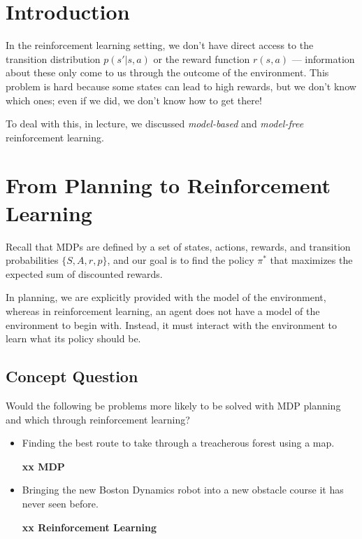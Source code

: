 \documentclass[12pt]{article}
\begin{document}


\section{Introduction}

In the reinforcement learning setting, we don't have direct access to the transition distribution $p(s'|s,a)$ or the reward function $r(s,a)$ --- information about these only come to us through the outcome of the environment. 
This problem is hard because some states can lead to high rewards, but we don't know which ones; even if we did, we don't know how to get there!

To deal with this, in lecture, we discussed \textit{model-based} and \textit{model-free} reinforcement learning. 


\section{From Planning to Reinforcement Learning}

Recall that MDPs are defined by a set of states, actions, rewards, and
transition probabilities $\{S, A, r, p\}$, and our goal is to find the
policy $\pi^\ast$ that maximizes the expected sum of discounted rewards.

In planning, we are explicitly provided with  the model of the environment, whereas in reinforcement learning, an agent does not have a model of the environment to begin with. Instead, it must interact with the environment to learn what its policy should be. 

\subsection{Concept Question}

Would the following be problems more likely to be solved with MDP planning
and which through  reinforcement learning?
%
\begin{itemize}
    \item Finding the best route to take through a treacherous forest using a map. 
    
{\bf xx    MDP}
    
    \item Bringing the new Boston Dynamics robot into a new obstacle course it has never seen before. 
    
{\bf xx     Reinforcement Learning }
    
\end{itemize}
\end{document}
